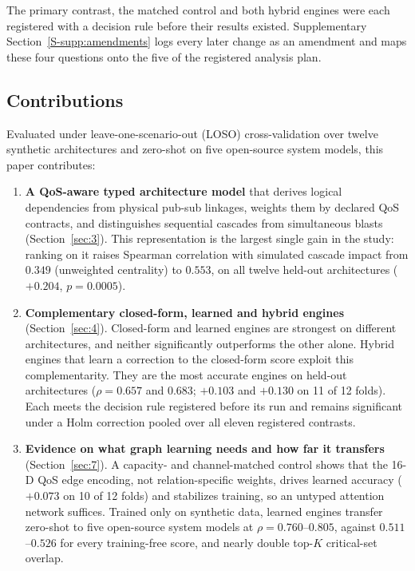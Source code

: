 \documentclass[preprint,3p]{elsarticle}
\providecommand{\tightlist}{%
  \setlength{\itemsep}{0pt}\setlength{\parskip}{0pt}}
\begin{document}
\noindent The primary contrast, the matched control and both hybrid engines were each registered with a decision rule before their results existed. Supplementary Section~\ref{S-supp:amendments} logs every later change as an amendment and maps these four questions onto the five of the registered analysis plan.

\subsection{Contributions}
\label{sec:1.5}

Evaluated under leave-one-scenario-out (LOSO) cross-validation over twelve synthetic architectures and zero-shot on five open-source system models, this paper contributes:

\begin{enumerate}\tightlist
    \item \textbf{A QoS-aware typed architecture model} that derives logical dependencies from physical pub-sub linkages, weights them by declared QoS contracts, and distinguishes sequential cascades from simultaneous blasts (Section~\ref{sec:3}). This representation is the largest single gain in the study: ranking on it raises Spearman correlation with simulated cascade impact from $0.349$ (unweighted centrality) to $0.553$, on all twelve held-out architectures ($+0.204$, $p = 0.0005$).
    \item \textbf{Complementary closed-form, learned and hybrid engines} (Section~\ref{sec:4}). Closed-form and learned engines are strongest on different architectures, and neither significantly outperforms the other alone. Hybrid engines that learn a correction to the closed-form score exploit this complementarity. They are the most accurate engines on held-out architectures ($\rho = 0.657$ and $0.683$; $+0.103$ and $+0.130$ on 11 of 12 folds). Each meets the decision rule registered before its run and remains significant under a Holm correction pooled over all eleven registered contrasts.
    \item \textbf{Evidence on what graph learning needs and how far it transfers} (Section~\ref{sec:7}). A capacity- and channel-matched control shows that the 16-D QoS edge encoding, not relation-specific weights, drives learned accuracy ($+0.073$ on 10 of 12 folds) and stabilizes training, so an untyped attention network suffices. Trained only on synthetic data, learned engines transfer zero-shot to five open-source system models at $\rho = 0.760$--$0.805$, against $0.511$--$0.526$ for every training-free score, and nearly double top-$K$ critical-set overlap.

\end{enumerate}
\end{document}
